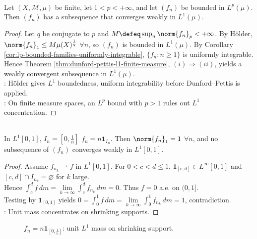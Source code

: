\begin{corollary} \label{cor:bounded-lp-weak-l1-subsequence} \\
Let $(X,\mathcal M,\mu)$ be finite, let $1<p<+\infty$, and let $(f_n)$ be bounded in $L^p(\mu)$.\\
Then $(f_n)$ has a subsequence that converges weakly in $L^1(\mu)$.
\begin{proof}
Let $q$ be conjugate to $p$ and $M\defeq\sup_n\norm{f_n}_p<+\infty$. By H\"older, $\norm{f_n}_1\leq M\mu(X)^{\frac{1}{q}}$ $\forall n$, so $(f_n)$ is bounded in $L^1(\mu)$. By Corollary \ref{cor:lp-bounded-families-uniformly-integrable}, $\{f_n:n\geq1\}$ is uniformly integrable.\\
Hence Theorem \ref{thm:dunford-pettis-l1-finite-measure}, $(i)\Rightarrow(ii)$, yields a weakly convergent subsequence in $L^1(\mu)$.\\
: H\"older gives $L^1$ boundedness, uniform integrability before Dunford--Pettis is applied.\\
: On finite measure spaces, an $L^p$ bound with $p>1$ rules out $L^1$ concentration.
\end{proof}
\end{corollary}

\begin{example} \label{ex:l1-concentration-no-weak-subsequence} \\
In $L^1[0,1]$, $I_n=[0,\frac{1}{n}]$ $f_n=n\mathbf{1}_{I_n}$. Then $\norm{f_n}_1=1$ $\forall n$, and no subsequence of $(f_n)$ converges weakly in $L^1[0,1]$.
\begin{proof}
Assume $f_{n_k}\rightharpoonup f$ in $L^1[0,1]$. For $0<c<d\leq1$, $\mathbf{1}_{[c,d]}\in L^\infty[0,1]$ and $[c,d]\cap I_{n_k}=\varnothing$ for $k$ large.\\
Hence $\int_c^d f\,dm=\lim\limits_{k\to\infty}\int_c^d f_{n_k}\,dm=0$. Thus $f=0$ a.e. on $(0,1]$.\\
Testing by $\mathbf{1}_{[0,1]}$ yields $0=\int_0^1f\,dm=\lim\limits_{k\to\infty}\int_0^1f_{n_k}\,dm=1$, contradiction.\\
: Unit mass concentrates on shrinking supports.
\end{proof}
\end{example}

\begin{figure}[H]
  \centering
  
  \caption{$f_n=n\mathbf{1}_{[0,\frac{1}{n}]}$: unit $L^1$ mass on shrinking support.}
  \label{fig:l1-concentration-spikes}
\end{figure}

